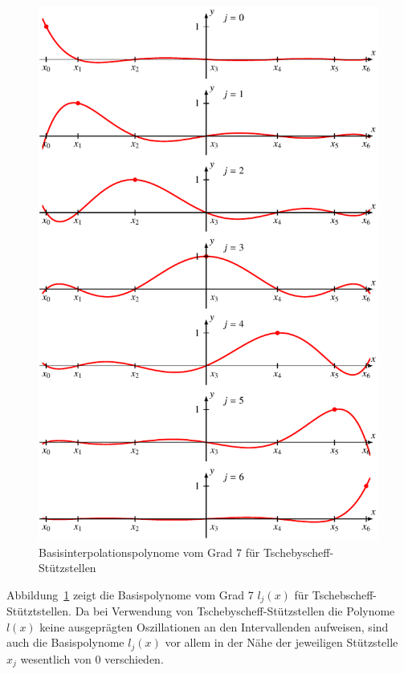 \begin{figure}
\centering
\includegraphics{chapters/30-interpolation/figures/tschebasis.pdf}
\caption{Basisinterpolationspolynome vom Grad 7 für
Tschebyscheff-Stützstellen
\label{buch:figure:tschebyscheffbasis}}
\end{figure}
Abbildung~\ref{buch:figure:tschebyscheffbasis} zeigt die Basispolynome
vom Grad 7 $l_j(x)$ für Tschebscheff-Stütztstellen.
Da bei Verwendung von Tschebyscheff-Stützstellen die Polynome $l(x)$
keine ausgeprägten Oszillationen an den Intervallenden aufweisen, 
sind auch die Basispolynome $l_j(x)$ vor allem in der Nähe der
jeweiligen Stützstelle $x_j$ wesentlich von $0$ verschieden.

